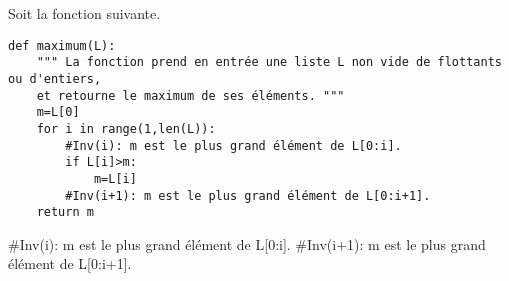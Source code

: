 Soit la fonction suivante.
\begin{lstlisting}
def maximum(L):
    """ La fonction prend en entrée une liste L non vide de flottants ou d'entiers,
    et retourne le maximum de ses éléments. """
    m=L[0]
    for i in range(1,len(L)):
        #Inv(i): m est le plus grand élément de L[0:i].
        if L[i]>m:
            m=L[i]
        #Inv(i+1): m est le plus grand élément de L[0:i+1].
    return m
\end{lstlisting}

\ifprof
\begin{corrige}
#Inv(i): m est le plus grand élément de L[0:i].
#Inv(i+1): m est le plus grand élément de L[0:i+1].
\end{corrige}
\else
\fi